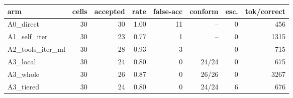 \begin{tabular}{lrrrrrrr}
\toprule
\textbf{arm} & \textbf{cells} & \textbf{accepted} & \textbf{rate} & \textbf{false-acc} & \textbf{conform} & \textbf{esc.} & \textbf{tok/correct} \\
\midrule
A0\_direct & 30 & 30 & 1.00 & 11 & -- & 0 & 456 \\
A1\_self\_iter & 30 & 23 & 0.77 & 1 & -- & 0 & 1315 \\
A2\_tools\_iter\_ml & 30 & 28 & 0.93 & 3 & -- & 0 & 715 \\
A3\_local & 30 & 24 & 0.80 & 0 & 24/24 & 0 & 675 \\
A3\_whole & 30 & 26 & 0.87 & 0 & 26/26 & 0 & 3267 \\
A3\_tiered & 30 & 24 & 0.80 & 0 & 24/24 & 6 & 676 \\
\bottomrule
\end{tabular}

